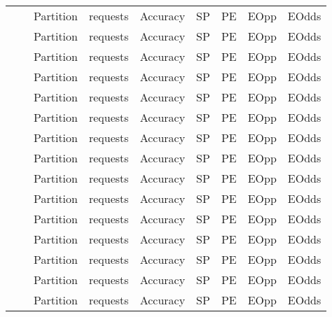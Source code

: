 \begin{tabular}{lllllllll}
        &       & Partition &  requests &  Accuracy &  SP &  PE &  EOpp &  EOdds \\
        &       & Partition &  requests &  Accuracy &  SP &  PE &  EOpp &  EOdds \\
        &       & Partition &  requests &  Accuracy &  SP &  PE &  EOpp &  EOdds \\
        &       & Partition &  requests &  Accuracy &  SP &  PE &  EOpp &  EOdds \\
        &       & Partition &  requests &  Accuracy &  SP &  PE &  EOpp &  EOdds \\
        &       & Partition &  requests &  Accuracy &  SP &  PE &  EOpp &  EOdds \\
        &       & Partition &  requests &  Accuracy &  SP &  PE &  EOpp &  EOdds \\
        &       & Partition &  requests &  Accuracy &  SP &  PE &  EOpp &  EOdds \\
        &       & Partition &  requests &  Accuracy &  SP &  PE &  EOpp &  EOdds \\
        &       & Partition &  requests &  Accuracy &  SP &  PE &  EOpp &  EOdds \\
        &       & Partition &  requests &  Accuracy &  SP &  PE &  EOpp &  EOdds \\
        &       & Partition &  requests &  Accuracy &  SP &  PE &  EOpp &  EOdds \\
        &       & Partition &  requests &  Accuracy &  SP &  PE &  EOpp &  EOdds \\
        &       & Partition &  requests &  Accuracy &  SP &  PE &  EOpp &  EOdds \\
        &       & Partition &  requests &  Accuracy &  SP &  PE &  EOpp &  EOdds \\
\bottomrule
\end{tabular}

